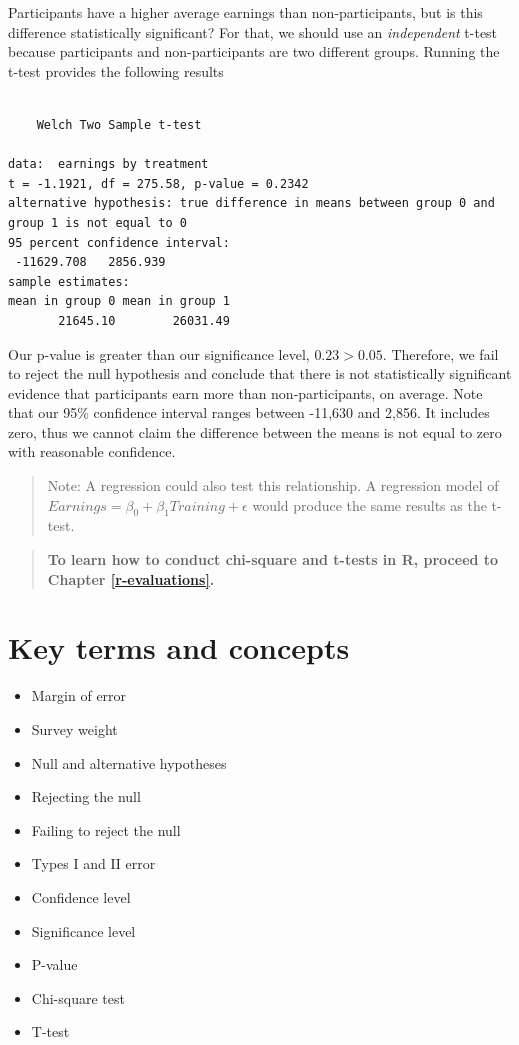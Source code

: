 \documentclass[
]{book}
\providecommand{\tightlist}{%
  \setlength{\itemsep}{0pt}\setlength{\parskip}{0pt}}
\begin{document}
Participants have a higher average earnings than non-participants, but is this difference statistically significant? For that, we should use an \emph{independent} t-test because participants and non-participants are two different groups. Running the t-test provides the following results

\begin{verbatim}

    Welch Two Sample t-test

data:  earnings by treatment
t = -1.1921, df = 275.58, p-value = 0.2342
alternative hypothesis: true difference in means between group 0 and group 1 is not equal to 0
95 percent confidence interval:
 -11629.708   2856.939
sample estimates:
mean in group 0 mean in group 1 
       21645.10        26031.49 
\end{verbatim}

Our p-value is greater than our significance level, \(0.23>0.05\). Therefore, we fail to reject the null hypothesis and conclude that there is not statistically significant evidence that participants earn more than non-participants, on average. Note that our 95\% confidence interval ranges between -11,630 and 2,856. It includes zero, thus we cannot claim the difference between the means is not equal to zero with reasonable confidence.

\begin{quote}
Note: A regression could also test this relationship. A regression model of \(Earnings=\beta_0+\beta_1Training+\epsilon\) would produce the same results as the t-test.
\end{quote}

\begin{quote}
\textbf{To learn how to conduct chi-square and t-tests in R, proceed to Chapter \ref{r-evaluations}.}
\end{quote}

\hypertarget{kt11}{%
\section{Key terms and concepts}\label{kt11}}

\begin{itemize}
\tightlist
\item
  Margin of error
\item
  Survey weight
\item
  Null and alternative hypotheses
\item
  Rejecting the null
\item
  Failing to reject the null
\item
  Types I and II error
\item
  Confidence level
\item
  Significance level
\item
  P-value
\item
  Chi-square test
\item
  T-test
\end{itemize}
\end{document}
